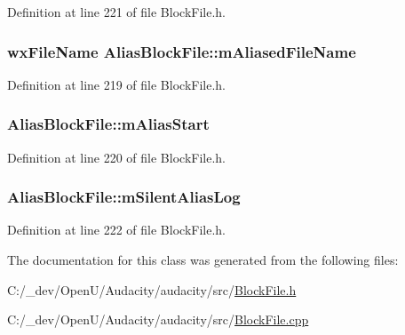 Definition at line 221 of file Block\+File.\+h.

\subsubsection[{\texorpdfstring{m\+Aliased\+File\+Name}{mAliasedFileName}}]{\setlength{\rightskip}{0pt plus 5cm}wx\+File\+Name Alias\+Block\+File\+::m\+Aliased\+File\+Name\hspace{0.3cm}{\ttfamily [protected]}}\hypertarget{class_alias_block_file_a8c098b2f0b168462fcaa45a6dad4682c}{}\label{class_alias_block_file_a8c098b2f0b168462fcaa45a6dad4682c}


Definition at line 219 of file Block\+File.\+h.

\subsubsection[{\texorpdfstring{m\+Alias\+Start}{mAliasStart}}]{ Alias\+Block\+File\+::m\+Alias\+Start\hspace{0.3cm}{\ttfamily [protected]}}\hypertarget{class_alias_block_file_a25ce7e8f04c9bc5300395c4eb4ebd5f4}{}\label{class_alias_block_file_a25ce7e8f04c9bc5300395c4eb4ebd5f4}


Definition at line 220 of file Block\+File.\+h.

\subsubsection[{\texorpdfstring{m\+Silent\+Alias\+Log}{mSilentAliasLog}}]{ Alias\+Block\+File\+::m\+Silent\+Alias\+Log\hspace{0.3cm}{\ttfamily [protected]}}\hypertarget{class_alias_block_file_a5c0cb39191f74e9941bd614fbd5d9a35}{}\label{class_alias_block_file_a5c0cb39191f74e9941bd614fbd5d9a35}


Definition at line 222 of file Block\+File.\+h.



The documentation for this class was generated from the following files\+:\begin{DoxyCompactItemize}
\item 
C\+:/\+\_\+dev/\+Open\+U/\+Audacity/audacity/src/\hyperlink{_block_file_8h}{Block\+File.\+h}\item 
C\+:/\+\_\+dev/\+Open\+U/\+Audacity/audacity/src/\hyperlink{_block_file_8cpp}{Block\+File.\+cpp}\end{DoxyCompactItemize}
